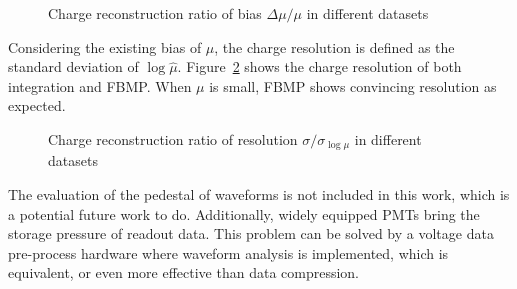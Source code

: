 \begin{figure}[H]
    \centering
    \resizebox{\textwidth}{!}{}
    \caption{\label{fig:biasmu} Charge reconstruction ratio of bias $\Delta\mu/\mu$ in different datasets}
\end{figure}

Considering the existing bias of $\mu$, the charge resolution is defined as the standard deviation of $\log{\hat{\mu}}$. Figure~\ref{fig:deltamu} shows the charge resolution of both integration and FBMP. When $\mu$ is small, FBMP shows convincing resolution as expected. 

\begin{figure}[H]
    \centering
    \resizebox{\textwidth}{!}{}
    \caption{\label{fig:deltamu} Charge reconstruction ratio of resolution $\sigma/\sigma_{\log\mu}$ in different datasets}
\end{figure}


The evaluation of the pedestal of waveforms is not included in this work, which is a potential future work to do. Additionally, widely equipped PMTs bring the storage pressure of readout data. This problem can be solved by a voltage data pre-process hardware where waveform analysis is implemented, which is equivalent, or even more effective than data compression. 

